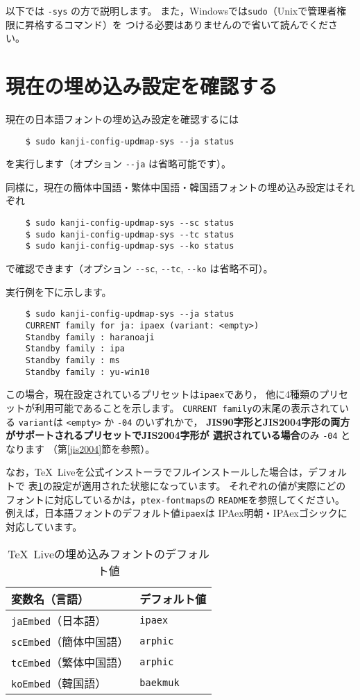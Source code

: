 \documentclass{jlreq}
\def\file#1{\texttt{#1}}
\def\command#1{\texttt{#1}}
\def\option#1{\texttt{-{}-#1}}
\def\TL{\TeX\ Live}
\begin{document}
以下では \command{-sys} の方で説明します。
また，Windowsでは\command{sudo}（Unixで管理者権限に昇格するコマンド）を
つける必要はありませんので省いて読んでください。


\clearpage


\section{現在の埋め込み設定を確認する}

現在の日本語フォントの埋め込み設定を確認するには
\begin{verbatim}
    $ sudo kanji-config-updmap-sys --ja status
\end{verbatim}
を実行します（オプション \option{ja} は省略可能です）。

同様に，現在の簡体中国語・繁体中国語・韓国語フォントの埋め込み設定はそれぞれ
\begin{verbatim}
    $ sudo kanji-config-updmap-sys --sc status
    $ sudo kanji-config-updmap-sys --tc status
    $ sudo kanji-config-updmap-sys --ko status
\end{verbatim}
で確認できます（オプション \option{sc}, \option{tc}, \option{ko} は省略不可）。

実行例を下に示します。
\begin{verbatim}
    $ sudo kanji-config-updmap-sys --ja status
    CURRENT family for ja: ipaex (variant: <empty>)
    Standby family : haranoaji
    Standby family : ipa
    Standby family : ms
    Standby family : yu-win10
\end{verbatim}
この場合，現在設定されているプリセットは\command{ipaex}であり，
他に4種類のプリセットが利用可能であることを示します。
\command{CURRENT family}の末尾の表示されている
\command{variant}は \command{<empty>} か \command{-04} のいずれかで，
\textbf{JIS90字形とJIS2004字形の両方がサポートされるプリセットでJIS2004字形が
選択されている場合}のみ \command{-04} となります
（第\ref{jis2004}節を参照）。

なお，\TL を公式インストーラでフルインストールした場合は，デフォルトで
表\ref{tldefault}の設定が適用された状態になっています。
それぞれの値が実際にどのフォントに対応しているかは，\file{ptex-fontmaps}の
\file{README}を参照してください。
例えば，日本語フォントのデフォルト値\command{ipaex}は
IPAex明朝・IPAexゴシックに対応しています。
\begin{table}[h]
  \centering
  \caption{\TL の埋め込みフォントのデフォルト値}\label{tldefault}
  \begin{tabular}{m{}m{}}
  \hline
  変数名（言語）                  & デフォルト値      \\ \hline
  \command{jaEmbed}（日本語）     & \command{ipaex}   \\
  \command{scEmbed}（簡体中国語） & \command{arphic}  \\
  \command{tcEmbed}（繁体中国語） & \command{arphic}  \\
  \command{koEmbed}（韓国語）     & \command{baekmuk} \\ \hline
\end{tabular}
\end{table}
\end{document}
